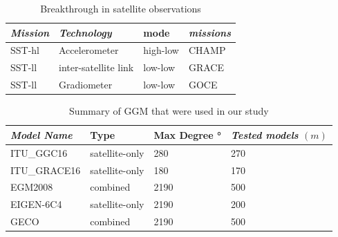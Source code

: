  
 \begin{table}[]
 	\centering
 	\caption{Breakthrough in satellite observations}
 	\label{table:satellite_evolution}
 	\begin{tabular}{@{}llll@{}}
 		\toprule
 		\emph{Mission} & \emph{Technology}  & mode & \emph{missions}\\ \midrule
 		SST-hl & Accelerometer & high-low & CHAMP \\
 		SST-ll & inter-satellite link & low-low& GRACE\\
 		SST-ll & Gradiometer & low-low & GOCE\\\bottomrule
 		
 	\end{tabular}
 \end{table}
 
 \begin{table}[]
 	\centering
 	\caption{Summary of GGM that were used in our study}
 	\label{table:ggm_models_summary}
 	\begin{tabular}{@{}llll@{}}
 		\toprule
 		\emph{Model Name} & Type  & Max Degree \si{\degree} & \emph{Tested models} $(m)$\\ \midrule
 		ITU\_GGC16 & satellite-only & 280 & 270 \\
 		ITU\_GRACE16 & satellite-only & 180 & 170\\
 		EGM2008 & combined & 2190 & 500\\
 		EIGEN-6C4 & satellite-only & 2190 & 200\\
 		GECO & combined & 2190 & 500\\ 
 \bottomrule
 		
 	\end{tabular}
 \end{table}
 

